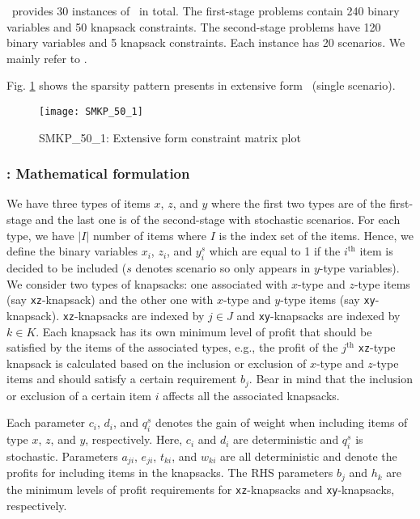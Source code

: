 \siplib\ provides 30 instances of \smkp\ in total. The first-stage problems contain 240 binary variables and 50 knapsack constraints. The second-stage problems have 120 binary variables and 5 knapsack constraints. Each instance has 20 scenarios. 
We mainly refer to \cite{journal:AAD2014}.%

Fig. \ref{fig:smkp_sparsity} shows the sparsity pattern presents in extensive form \smkp\ (single scenario).
\begin{figure}[H]
	\centering
	\texttt{[image: SMKP\_50\_1]}
	\caption{SMKP\_50\_1: Extensive form constraint matrix plot}
	\label{fig:smkp_sparsity}
\end{figure}

\subsubsection{\smkp: Mathematical formulation}
We have three types of items $x$, $z$, and $y$ where the first two types are of the first-stage and the last one is of the second-stage with stochastic scenarios. For each type, we have $|I|$ number of items where $I$ is the index set of the items. Hence, we define the binary variables $x_i$, $z_i$, and $y_i^s$ which are equal to 1 if the $i^{\mathrm{th}}$ item is decided to be included ($s$ denotes scenario so only appears in $y$-type variables). We consider two types of knapsacks: one associated with $x$-type and $z$-type items (say \texttt{xz}-knapsack) and the other one with $x$-type and $y$-type items (say \texttt{xy}-knapsack). \texttt{xz}-knapsacks are indexed by $j\in J$ and \texttt{xy}-knapsacks are indexed by $k\in K$.  Each knapsack has its own minimum level of profit that should be satisfied by the items of the associated types, e.g., the profit of the $j^{\mathrm{th}}$ \texttt{xz}-type knapsack is calculated based on the inclusion or exclusion of $x$-type and $z$-type items and should satisfy a certain requirement $b_j$. Bear in mind that the inclusion or exclusion of a certain item $i$ affects all the associated knapsacks.
 
Each parameter $c_i$, $d_i$, and $q_i^s$ denotes the gain of weight when including items of type $x$, $z$, and $y$, respectively. Here, $c_i$ and $d_i$ are deterministic and $q_i^s$ is stochastic. Parameters $a_{ji}$, $e_{ji}$, $t_{ki}$, and $w_{ki}$ are all deterministic and denote the profits for including items in the knapsacks. The RHS parameters $b_j$ and $h_k$ are the minimum levels of profit requirements for \texttt{xz}-knapsacks and \texttt{xy}-knapsacks, respectively.

